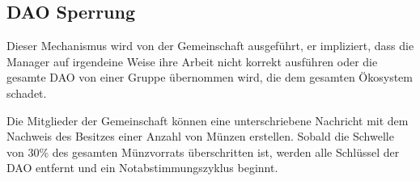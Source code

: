 \documentclass{article}
\begin{document}
\subsection{DAO Sperrung}

Dieser Mechanismus wird von der Gemeinschaft ausgeführt, er impliziert, dass die Manager auf irgendeine Weise ihre Arbeit nicht korrekt ausführen oder die gesamte DAO von einer Gruppe übernommen wird, die dem gesamten Ökosystem schadet.

Die Mitglieder der Gemeinschaft können eine unterschriebene Nachricht mit dem Nachweis des Besitzes einer Anzahl von Münzen erstellen. Sobald die Schwelle von 30\% des gesamten Münzvorrats überschritten ist, werden alle Schlüssel der DAO entfernt und ein Notabstimmungszyklus beginnt.
\end{document}
